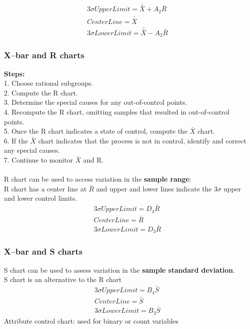 \documentclass[../main.tex]{subfiles}
\begin{document}
\begin{align*}
    3\sigma UpperLimit = \bar{\bar{X}}+A_2\bar{R} \\
    CenterLine=\bar{\bar{X}}\\
    3\sigma LowerLimit = \bar{\bar{X}} - A_2 \bar R
\end{align*}

\subsubsection*{X–bar and R charts}
\textbf{Steps:}\\
1. Choose rational subgroups.\\
2. Compute the R chart.\\
3. Determine the special causes for any out-of-control points.\\
4. Recompute the R chart, omitting samples that resulted in out-of-control points.\\
5. Once the R chart indicates a state of control, compute the $\bar X$ chart.\\
6. If the $\bar X$ chart indicates that the process is not in control, identify and correct any special causes.\\
7. Continue to monitor $\bar X$ and R.\\\\
R chart can be used to access variation in the \textbf{sample range};\\
R chart has a center line at $\bar R$ and upper and lower lines indicate the $3\sigma$ upper and lower control limits.
\begin{align*}
    3\sigma UpperLimit = D_4\bar R\\
    CenterLine=\bar R\\
    3\sigma LowerLimit = D_3\bar R
\end{align*}

\subsubsection*{X–bar and S charts}

S chart can be used to assess variation in the \textbf{sample standard deviation}.\\
S chart is an alternative to the R chart
\begin{align*}
    3\sigma UpperLimit = B_4\bar S\\
    CenterLine=\bar S\\
    3\sigma LowerLimit = B_3\bar S
\end{align*}
Attribute control chart: used for binary or count variables\\
\end{document}
